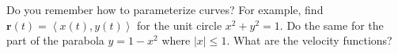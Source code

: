 Do you remember how to parameterize curves?  For example, find $\mathbf{r}(t)=\left<x(t),y(t)\right>$ for the unit circle $x^2+y^2=1$.  Do the same for the part of the parabola $y=1-x^2$ where $|x|\le 1$.  What are the velocity functions?